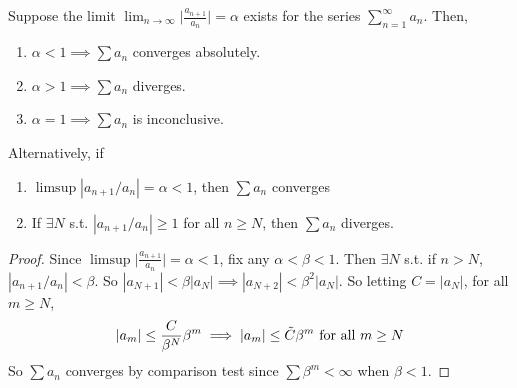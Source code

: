   \begin{theorem}
    \label{thm:ratio-test}
    Suppose the limit $\lim_{n\rightarrow \infty} \big| \frac{a_{n+1}}{a_n} \big| = \alpha$ exists for the series $\sum_{n=1}^\infty a_n$. Then, 
    \begin{enumerate}
      \item $\alpha < 1 \implies \sum a_n$ converges absolutely. 
      \item $\alpha > 1 \implies \sum a_n$ diverges.
      \item $\alpha = 1 \implies \sum a_n$ is inconclusive. 
    \end{enumerate}
    Alternatively, if 
    \begin{enumerate}
      \item $\limsup |a_{n+1}/a_n| = \alpha < 1$, then $\sum a_n$ converges 
      \item If $\exists N$ s.t. $|a_{n+1}/a_n| \geq 1$ for all $n \geq N$, then $\sum a_n$ diverges. 
    \end{enumerate}
  \end{theorem}
  \begin{proof}
    Since $\limsup \big| \frac{a_{n+1}}{a_n} \big| = \alpha < 1$, fix any $\alpha < \beta < 1$. Then $\exists N$ s.t. if $n > N$, $|a_{n+1}/a_n| < \beta$. So $|a_{N+1}| < \beta |a_N| \implies |a_{N+2}| < \beta^2 |a_N|$. So letting $C = |a_N|$, for all $m \geq N$, 
    \begin{equation}
      |a_m| \leq \frac{C}{\beta^N} \beta^m \implies |a_m| \leq \Tilde{C} \beta^m \text{ for all } m \geq N
    \end{equation}
    So $\sum a_n$ converges by comparison test since $\sum \beta^m < \infty$ when $\beta < 1$. 
  \end{proof}

